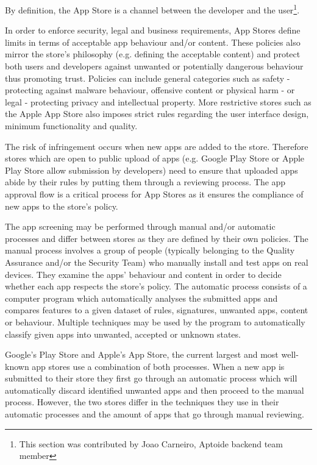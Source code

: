By definition, the App Store is a channel between the developer and the user\footnote{This section was contributed by Joao Carneiro, Aptoide backend team member}.

In order to enforce security, legal and business requirements, App Stores define limits in terms of acceptable app behaviour and/or content. These policies also mirror the store's philosophy (e.g. defining the acceptable content) and protect both users and developers against unwanted or potentially dangerous behaviour thus promoting trust. Policies can include general categories such as safety - protecting against malware behaviour, offensive content or physical harm - or legal - protecting privacy and intellectual property. More restrictive stores such as the Apple App Store also imposes strict rules regarding the user interface design, minimum functionality and quality. \cite{GooglePolicyWebsite} \cite{ApplePolicyWebsite}


The risk of infringement occurs when new apps are added to the store. Therefore stores which are open to public upload of apps (e.g. Google Play Store or Apple Play Store allow submission by developers) need to ensure that uploaded apps abide by their rules by putting them through a reviewing process. The app approval flow is a critical process for App Stores as it ensures the compliance of new apps to the store's policy.

The app screening may be performed through manual and/or automatic processes and differ between stores as they are defined by their own policies. The manual process involves a group of people (typically belonging to the Quality Assurance and/or the Security Team) who manually install and test apps on real devices. They examine the apps' behaviour and content in order to decide whether each app respects the store's policy. The automatic process consists of a computer program which automatically analyses the submitted apps and compares features to a given dataset of rules, signatures, unwanted apps, content or behaviour. Multiple techniques may be used by the program to automatically classify given apps into unwanted, accepted or unknown states\cite{Bhattacharya2017}.

Google's Play Store and Apple's App Store, the current largest and most well-known app stores use a combination of both processes. When a new app is submitted to their store they first go through an automatic process which will automatically discard identified unwanted apps and then proceed to the manual process. However, the two stores differ in the techniques they use in their automatic processes and the amount of apps that go through manual reviewing\cite{AppleInsiderWebsite}\cite{AndroidWhitePaper}.


